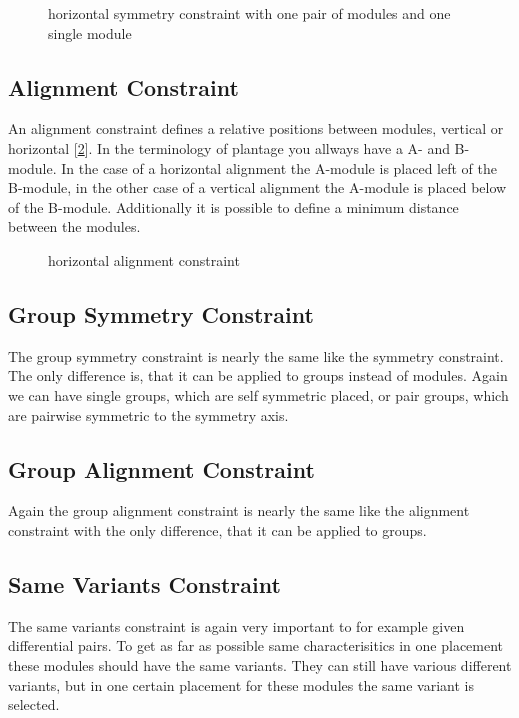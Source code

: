 \begin{figure}
	\centering
	
	\caption{horizontal symmetry constraint with one pair of modules and one single module}
	\label{fig:constraint_symmetry}
\end{figure}

\subsection{Alignment Constraint}
An alignment constraint defines a relative positions between modules, vertical or horizontal [\ref{fig:constraint_alignment}]. In the terminology of plantage you allways have a A- and B-module. In the case of a horizontal alignment the A-module is placed left of the B-module, in the other case of a vertical alignment the A-module is placed below of the B-module. Additionally it is possible to define a minimum distance between the modules.

\begin{figure}
	\centering
	
	\caption{horizontal alignment constraint}
	\label{fig:constraint_alignment}
\end{figure}

\subsection{Group Symmetry Constraint}
The group symmetry constraint is nearly the same like the symmetry constraint. The only difference is, that it can be applied to groups instead of modules. Again we can have single groups, which are self symmetric placed, or pair groups, which are pairwise symmetric to the symmetry axis.

\subsection{Group Alignment Constraint}
Again the group alignment constraint is nearly the same like the alignment constraint with the only difference, that it can be applied to groups.

\subsection{Same Variants Constraint}
The same variants constraint is again very important to for example given differential pairs. To get as far as possible same characterisitics in one placement these modules should have the same variants. They can still have various different variants, but in one certain placement for these modules the same variant is selected.

